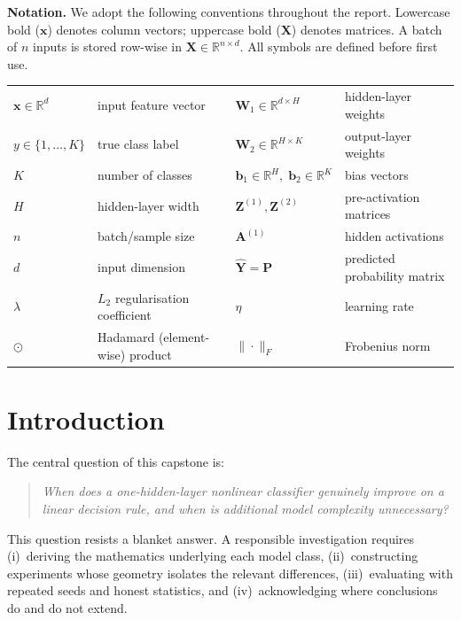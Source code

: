 \documentclass[11pt]{article}
\newcommand{\R}{\mathbb{R}}
\newcommand{\bx}{\mathbf{x}}
\newcommand{\bX}{\mathbf{X}}
\newcommand{\bW}{\mathbf{W}}
\newcommand{\bb}{\mathbf{b}}
\newcommand{\bY}{\mathbf{Y}}
\newcommand{\bP}{\mathbf{P}}
\newcommand{\bZ}{\mathbf{Z}}
\newcommand{\bA}{\mathbf{A}}
\begin{document}
\vspace{-0.3em}
\noindent\textbf{Notation.}\;
We adopt the following conventions throughout the report.
Lowercase bold ($\bx$) denotes column vectors; uppercase bold ($\bX$) denotes matrices.
A batch of $n$ inputs is stored row-wise in $\bX\in\R^{n\times d}$.
All symbols are defined before first use.
\begin{center}
\small
\begin{tabular}{@{}ll@{\qquad}ll@{}}
\toprule
$\bx\in\R^{d}$ & input feature vector &
$\bW_1\!\in\!\R^{d\times H}$ & hidden-layer weights \\
$y\in\{1,\dots,K\}$ & true class label &
$\bW_2\!\in\!\R^{H\times K}$ & output-layer weights \\
$K$ & number of classes &
$\bb_1\!\in\!\R^{H},\;\bb_2\!\in\!\R^{K}$ & bias vectors \\
$H$ & hidden-layer width &
$\bZ^{(1)},\bZ^{(2)}$ & pre-activation matrices \\
$n$ & batch/sample size &
$\bA^{(1)}$ & hidden activations \\
$d$ & input dimension &
$\hat{\bY}\!=\!\bP$ & predicted probability matrix \\
$\lambda$ & $L_2$ regularisation coefficient &
$\eta$ & learning rate \\
$\odot$ & Hadamard (element-wise) product &
$\|\cdot\|_F$ & Frobenius norm \\
\bottomrule
\end{tabular}
\end{center}

\section{Introduction}

The central question of this capstone is:
\begin{quote}
\itshape When does a one-hidden-layer nonlinear classifier genuinely improve on a linear
decision rule, and when is additional model complexity unnecessary?
\end{quote}

This question resists a blanket answer.  A responsible investigation requires
(i)~deriving the mathematics underlying each model class,
(ii)~constructing experiments whose geometry isolates the relevant differences,
(iii)~evaluating with repeated seeds and honest statistics, and
(iv)~acknowledging where conclusions do and do not extend.
\end{document}
